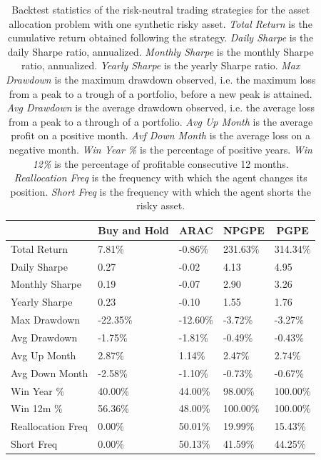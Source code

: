 \begin{table}[t!]
\centering
\begin{tabular}{@{}lllll@{}}
\toprule
 & \multicolumn{1}{c}{Buy and Hold} & \multicolumn{1}{c}{ARAC} & \multicolumn{1}{c}{NPGPE} & \multicolumn{1}{c}{PGPE} \\ \midrule
Total Return & 7.81\% & -0.86\% & 231.63\% & 314.34\% \\
Daily Sharpe & 0.27 & -0.02 & 4.13 & 4.95 \\
Monthly Sharpe & 0.19 & -0.07 & 2.90 & 3.26 \\
Yearly Sharpe & 0.23 & -0.10 & 1.55 & 1.76 \\
Max Drawdown & -22.35\% & -12.60\% & -3.72\% & -3.27\% \\
Avg Drawdown & -1.75\% & -1.81\% & -0.49\% & -0.43\% \\
Avg Up Month & 2.87\% & 1.14\% & 2.47\% & 2.74\% \\
Avg Down Month & -2.58\% & -1.10\% & -0.73\% & -0.67\% \\
Win Year \% & 40.00\% & 44.00\% & 98.00\% & 100.00\% \\
Win 12m \% & 56.36\% & 48.00\% & 100.00\% & 100.00\% \\
Reallocation Freq & 0.00\% & 50.01\% & 19.99\% & 15.43\% \\
Short Freq & 0.00\% & 50.13\% & 41.59\% & 44.25\% \\ \bottomrule
\end{tabular}
\caption[Backtest statistics for risk-neutral learning with one synthetic risky asset]{Backtest statistics of the risk-neutral trading strategies for the asset allocation problem with one synthetic risky asset. \emph{Total Return} is the cumulative return obtained following the strategy. \emph{Daily Sharpe} is the daily Sharpe ratio, annualized. \emph{Monthly Sharpe} is the monthly Sharpe ratio, annualized. \emph{Yearly Sharpe} is the yearly Sharpe ratio. \emph{Max Drawdown} is the maximum drawdown observed, i.e. the maximum loss from a peak to a trough of a portfolio, before a new peak is attained. \emph{Avg Drawdown} is the average drawdown observed, i.e. the average loss from a peak to a through of a portfolio. \emph{Avg Up Month} is the average profit on a positive month. \emph{Avf Down Month} is the average loss on a negative month. \emph{Win Year \%} is the percentage of positive years. \emph{Win 12\%} is the percentage of profitable consecutive 12 months. \emph{Reallocation Freq} is the frequency with which the agent changes its position. \emph{Short Freq} is the frequency with which the agent shorts the risky asset.}
\label{tab:single_synthetic_neutral_performance}
\end{table}


